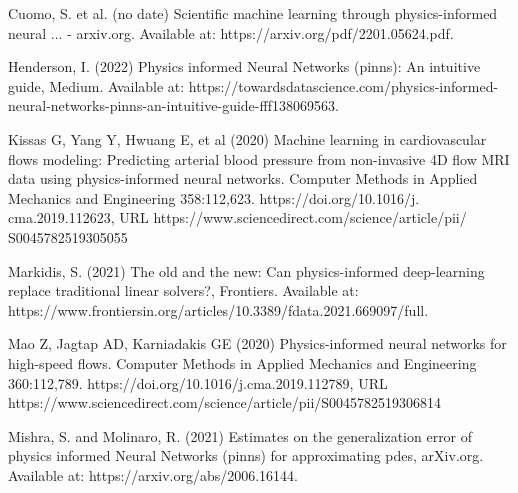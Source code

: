 \documentclass{article}
\begin{document}
Cuomo, S. et al. (no date) Scientific machine learning through physics-informed neural ... - arxiv.org. Available at: https://arxiv.org/pdf/2201.05624.pdf. 

Henderson, I. (2022) Physics informed Neural Networks (pinns): An intuitive guide, Medium. Available at: https://towardsdatascience.com/physics-informed-neural-networks-pinns-an-intuitive-guide-fff138069563. 

Kissas G, Yang Y, Hwuang E, et al (2020) Machine learning in cardiovascular flows modeling: Predicting arterial blood pressure from non-invasive 4D flow MRI data using physics-informed neural networks. Computer Methods in Applied Mechanics and Engineering 358:112,623. https://doi.org/10.1016/j. cma.2019.112623, URL https://www.sciencedirect.com/science/article/pii/ S0045782519305055 

Markidis, S. (2021) The old and the new: Can physics-informed deep-learning replace traditional linear solvers?, Frontiers. Available at:
https://www.frontiersin.org/articles/10.3389/fdata.2021.669097/full. 

Mao Z, Jagtap AD, Karniadakis GE (2020) Physics-informed neural networks for high-speed flows. Computer Methods in Applied Mechanics and Engineering 360:112,789. https://doi.org/10.1016/j.cma.2019.112789, URL https://www.sciencedirect.com/science/article/pii/S0045782519306814

Mishra, S. and Molinaro, R. (2021) Estimates on the generalization error of physics informed Neural Networks (pinns) for approximating pdes, arXiv.org. Available at: https://arxiv.org/abs/2006.16144. 
\end{document}
